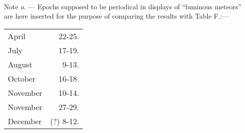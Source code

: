 \documentclass[a4paper, 12pt, oneside]{article}
\begin{document}
\paragraph{}
Note \emph{a}. --- Epochs supposed to be periodical in displays of ``luminous meteors'' are here inserted for the purpose of comparing the results with Table F.:---
\begin{table}[H]
    \centering
    \Fontauri
    \begin{tabular}{l r}
        April & 22-25. \\
        July & 17-19. \\
        August & 9-13. \\
        October & 16-18. \\
        November & 10-14. \\
        November & 27-29. \\
        December & (?) 8-12. \\
    \end{tabular}
\end{table}
\end{document}
